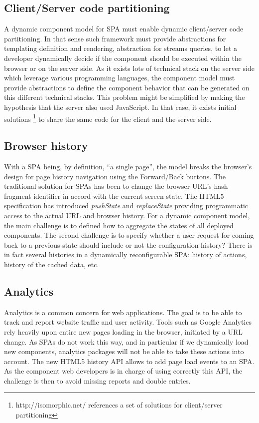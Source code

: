 \subsection{Client/Server code partitioning}
A dynamic component model for SPA must enable dynamic client/server code partitioning. In that sense such framework must provide abstractions for templating definition and rendering, abstraction for streams queries, to let a developer dynamically decide if the component should be executed within the browser or on the server side. As it exists lots of technical stack on the server side which leverage various programming languages, the component model must provide abstractions to define the component behavior that can be generated on this different technical stacks. This problem might be simplified by making the hypothesis that the server also used JavaScript. In that case, it exists initial solutions \footnote{http://isomorphic.net/ references a set of solutions for client/server partitioning} to share the same code for the client and the server side.

\subsection{Browser history}
With a SPA being, by definition, ``a single page'', the model breaks the browser's design for page history navigation using the Forward/Back buttons. The traditional solution for SPAs has been to change the browser URL's hash fragment identifier in accord with the current screen state.
The HTML5 specification has introduced \textit{pushState} and \textit{replaceState} providing programmatic access to the actual URL and browser history.
For a dynamic component model, the main challenge is to defined how to aggregate the states of all deployed components.
The second challenge is to specify whether a user request for coming back to a previous state should include or not the configuration history?
There is in fact several histories in a dynamically reconfigurable SPA: history of actions, history of the cached data, etc.



\subsection{Analytics}

Analytics is a common concern for web applications. The goal is to be able to track and report website traffic and user activity.
Tools such as Google Analytics rely heavily upon entire new pages loading in the browser, initiated by a URL change. As SPAs do not work this way, and in particular if we dynamically load new components, analytics packages will not be able to take these actions into account.
The new HTML5 history API allows to add page load events to an SPA.
As the component web developers is in charge of using correctly this API, the challenge is then to avoid missing reports and double entries.


